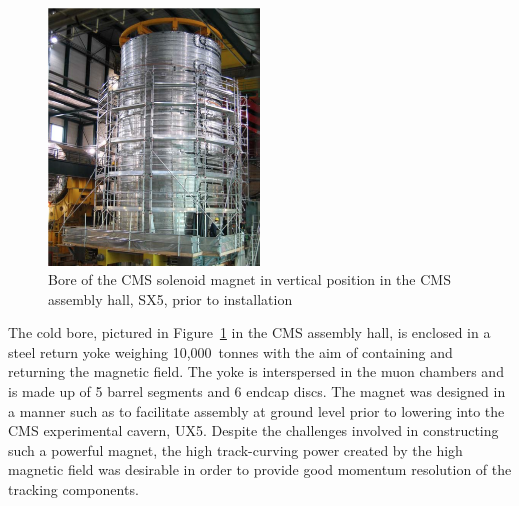 \begin{figure}[hbtp]
   \centering
     \includegraphics[width=0.5\textwidth]{Chapters/02_Detector/Images/Cold_mass.png}\hfill
     \caption[Bore of the CMS solenoid magnet in vertical position in the CMS assembly hall, SX5.]{Bore of the
     CMS solenoid magnet in vertical position in the CMS assembly hall, SX5, prior to installation \cite{CMS_experiment}}
     \label{fig:CMS_magnet_cold_bore}
\end{figure}
 
The cold bore, pictured in Figure~\ref{fig:CMS_magnet_cold_bore} in the CMS assembly hall, is enclosed in a
steel return yoke weighing 10,000~tonnes with the aim of containing and returning the magnetic field. The yoke is interspersed in the
muon chambers and is made up of 5 barrel segments and 6 endcap discs. The magnet was designed in a manner such
as to facilitate assembly at ground level prior to lowering into the CMS experimental cavern, UX5.
Despite the challenges involved in constructing such a powerful magnet, the high track-curving power created
by the high magnetic field was desirable in order to provide good momentum resolution of the tracking
components.

